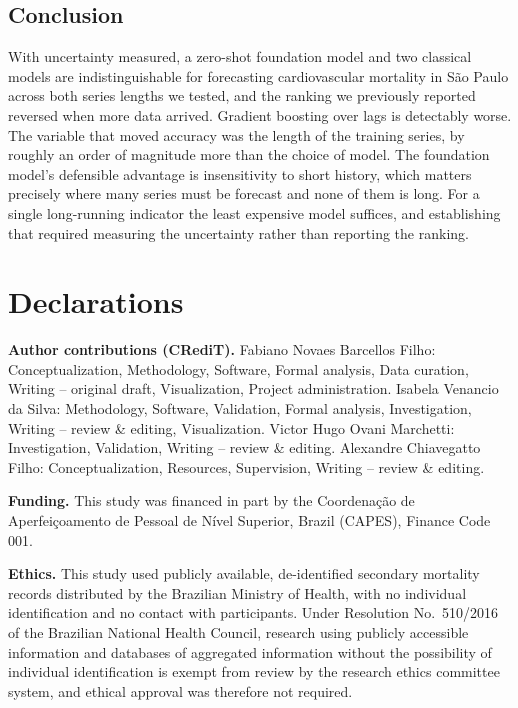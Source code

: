 \subsection{Conclusion}

With uncertainty measured, a zero-shot foundation model and two classical models are
indistinguishable for forecasting cardiovascular mortality in S\~ao Paulo across both series
lengths we tested, and the ranking we previously reported reversed when more data arrived.
Gradient boosting over lags is detectably worse. The variable that moved accuracy was the
length of the training series, by roughly an order of magnitude more than the choice of
model. The foundation model's defensible advantage is insensitivity to short history, which
matters precisely where many series must be forecast and none of them is long. For a single
long-running indicator the least expensive model suffices, and establishing that required
measuring the uncertainty rather than reporting the ranking.

\section*{Declarations}

\ifdefined\BLIND\else
\textbf{Author contributions (CRediT).} Fabiano Novaes Barcellos Filho: Conceptualization,
Methodology, Software, Formal analysis, Data curation, Writing -- original draft,
Visualization, Project administration. Isabela Venancio da Silva: Methodology, Software,
Validation, Formal analysis, Investigation, Writing -- review \& editing, Visualization. Victor Hugo Ovani Marchetti:
Investigation, Validation, Writing -- review \& editing.
Alexandre Chiavegatto Filho: Conceptualization, Resources, Supervision, Writing -- review
\& editing.

\textbf{Funding.} This study was financed in part by the Coordena\c{c}\~ao de
Aperfei\c{c}oamento de Pessoal de N\'ivel Superior, Brazil (CAPES), Finance Code 001.
\fi

\textbf{Ethics.} This study used publicly available, de-identified secondary mortality
records distributed by the Brazilian Ministry of Health, with no individual identification
and no contact with participants. Under Resolution No.~510/2016 of the Brazilian National
Health Council, research using publicly accessible information and databases of aggregated
information without the possibility of individual identification is exempt from review by
the research ethics committee system, and ethical approval was therefore not required.


